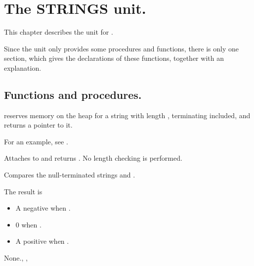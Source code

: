 %
%
%
%
%
\chapter{The STRINGS unit.}
This chapter describes the  unit for 
\fpc. 

Since the unit only provides some procedures and functions, there is
only one section, which gives the declarations of these functions, together
with an explanation. 

\section{Functions and procedures.}

{
 reserves memory on the heap for a string with length ,
terminating  included, and returns a pointer to it.
}

For an example, see .

{
Attaches  to  and returns .
}
{No length checking is performed.}
{}

\html{}

{
Compares the null-terminated strings  and .

The result is 
\begin{itemize}
\item A negative  when .
\item 0 when .
\item A positive  when .
\end{itemize}
}
{None.}{, , }

